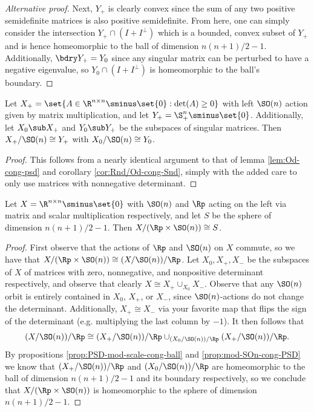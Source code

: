 \begin{proposition}
\begin{proof}[Alternative proof]
        Next, $Y_+$ is clearly convex since the sum of any two positive semidefinite matrices is also positive semidefinite.
        From here, one can simply consider the intersection $Y_+ \cap (I + I^\perp)$ which is a bounded, convex subset of $Y_+$ and is hence homeomorphic to the ball of dimension $n(n+1)/2 - 1$.
        Additionally, $\bdry Y_+ = Y_0$ since any singular matrix can be perturbed to have a negative eigenvalue, so $Y_0 \cap (I + I^\perp)$ is homeomorphic to the ball's boundary.
    \end{proof}
\end{proposition}

\begin{proposition}\label{prop:mod-SOn-cong-PSD}
    Let  $X_+ = \set{A \in \R^{n \times n} \sminus \set{0} : \det(A) \geq 0}$ with left $\SO(n)$ action given by matrix multiplication, and let $Y_+ = \S^n_+ \sminus \set{0}$.
    Additionally, let $X_0 \sub X_+$ and $Y_0 \sub Y_+$ be the subspaces of singular matrices.
    Then $X_+ / \SO(n) \cong Y_+$ with $X_0 / \SO(n) \cong Y_0$.
    \begin{proof}
        This follows from a nearly identical argument to that of lemma \ref{lem:Od-cong-psd} and corollary \ref{cor:Rnd/Od-cong-Snd}, simply with the added care to only use matrices with nonnegative determinant.
    \end{proof}
\end{proposition}

\begin{theorem}[Casson]\label{thm:Casson}
    Let $X = \R^{n \times n} \sminus \set{0}$ with $\SO(n)$ and $\Rp$ acting on the left via matrix and scalar multiplication respectively, and let $S$ be the sphere of dimension $n(n+1)/2 - 1$.
    Then $X / (\Rp \times \SO(n)) \cong S$.
    \begin{proof}
        First observe that the actions of $\Rp$ and $\SO(n)$ on $X$ commute, so we have that
        $X / (\Rp \times \SO(n)) \cong (X / \SO(n)) / \Rp$.
        Let $X_0,X_+,X_-$ be the subspaces of $X$ of matrices with zero, nonnegative, and nonpositive determinant respectively, and observe that clearly $X \cong X_+ \cup_{X_0} X_-$.
        Observe that any $\SO(n)$ orbit is entirely contained in $X_0$, $X_+$, or $X_-$, since $\SO(n)$-actions do not change the determinant.
        Additionally, $X_+ \cong X_-$ via your favorite map that flips the sign of the determinant (e.g. multiplying the last column by $-1$).
        It then follows that
        \[
            (X / \SO(n)) / \Rp
            \cong (X_+ / \SO(n)) / \Rp
            \cup_{(X_0 / \SO(n)) / \Rp}
             (X_+ / \SO(n)) / \Rp.
        \]
        By propositions \ref{prop:PSD-mod-scale-cong-ball} and \ref{prop:mod-SOn-cong-PSD} we know that $(X_+ / \SO(n))/\Rp$ and $(X_0 / \SO(n))/\Rp$ are homeomorphic to the ball of dimension $n(n+1)/2 - 1$ and its boundary respectively, so we conclude that $X / (\Rp \times \SO(n))$ is homeomorphic to the sphere of dimension $n(n+1)/2 - 1$.
    \end{proof}
\end{theorem}

